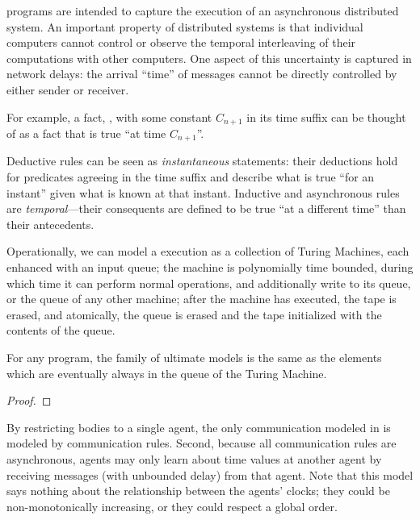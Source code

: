 \lang programs are intended to capture the execution of an asynchronous distributed system.  An important property of distributed systems is that individual computers cannot control or observe the temporal interleaving of their computations with other computers.  One aspect of this uncertainty is captured in network delays: the arrival ``time'' of messages cannot be directly controlled by either sender or receiver.

For example, a fact, , with some constant $C_{n+1}$ in its time
suffix can be thought of as a fact that is true ``at time $C_{n+1}$''.

Deductive rules can be seen as {\em instantaneous} statements: their deductions hold for 
predicates agreeing in the time suffix and describe what is true ``for an instant'' given 
what is known at that instant.
 Inductive and asynchronous 
 rules are {\em temporal}---their consequents are defined to
be true ``at a different time'' than their antecedents.

Operationally, we can model a \lang execution as a collection of Turing Machines, each enhanced with an input queue; the machine is polynomially time bounded, during which time it can perform normal operations, and additionally write to its queue, or the queue of any other machine; after the machine has executed, the tape is erased, and atomically, the queue is erased and the tape initialized with the contents of the queue. 

\begin{lemma}
For any \lang program, the family of ultimate models is the same as the elements which are eventually always in the queue of the Turing Machine. 
\end{lemma}
\begin{proof}
\end{proof}

By restricting bodies to a single agent, the only communication
modeled in \lang is modeled by communication rules.  Second, because
all communication rules are asynchronous, agents may only learn about
time values at another agent by receiving messages (with unbounded
delay) from that agent.  Note that this model says nothing about the
relationship between the agents' clocks; they could be
non-monotonically increasing, or they could respect a global order.

%
